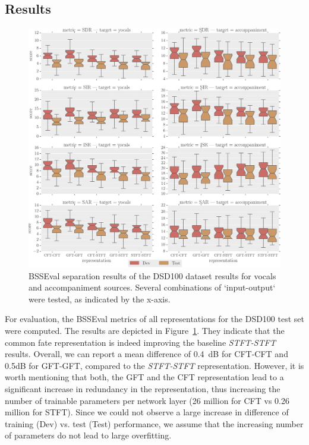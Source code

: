 \subsection{Results}

\begin{figure}[t]
\centering
\includegraphics[width=1.1\textwidth]{Chapters/06_Separation_Unknown/figures/boxplot.pdf}
\caption{BSSEval separation results of the DSD100 dataset results for vocals and accompaniment sources. Several combinations of `input-output` were tested, as indicated by the x-axis.}
\label{fig:deep_cft_boxplots}
\end{figure}

For evaluation, the BSSEval metrics of all representations for the DSD100 test set were computed.
The results are depicted in Figure~\ref{fig:deep_cft_boxplots}.
They indicate that the common fate representation is indeed improving the baseline \emph{STFT-STFT} results.
Overall, we can report a mean difference of 0.4~dB for CFT-CFT and 0.5dB for GFT-GFT, compared to the \emph{STFT-STFT} representation.
However, it is worth mentioning that both, the GFT and the CFT representation lead to a significant increase in redundancy in the representation, thus increasing the number of trainable parameters per network layer (26 million for CFT vs 0.26 million for STFT). Since we could not observe a large increase in difference of training (Dev) vs. test (Test) performance, we assume that the increasing number of parameters do not lead to large overfitting.

